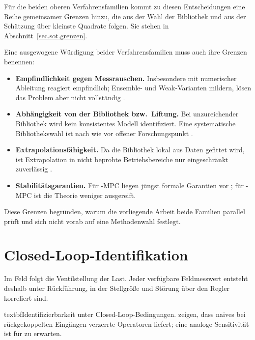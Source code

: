 Für die beiden oberen Verfahrensfamilien kommt zu diesen Entscheidungen
eine Reihe gemeinsamer Grenzen hinzu, die aus der Wahl der Bibliothek und
aus der Schätzung über kleinste Quadrate folgen. Sie stehen in
Abschnitt~\ref{sec.sot.grenzen}.

\label{sec.sot.grenzen}

Eine ausgewogene Würdigung beider Verfahrensfamilien muss auch ihre
Grenzen benennen:

\begin{itemize}
  \item \textbf{Empfindlichkeit gegen Messrauschen.} Insbesondere
    \sindy{} mit numerischer Ableitung reagiert empfindlich; Ensemble-
    und Weak-Varianten mildern, lösen das Problem aber nicht vollständig
    \cite{faselEnsembleSINDyRobustSparse2022, messengerWeakSINDyPartial2021}.
  \item \textbf{Abhängigkeit von der Bibliothek bzw.\ Liftung.} Bei
    unzureichender Bibliothek wird kein konsistentes Modell
    identifiziert. Eine systematische Bibliothekswahl ist nach wie vor
    offener Forschungspunkt \cite{kaiserSparseIdentificationNonlinear2018}.
  \item \textbf{Extrapolationsfähigkeit.} Da die Bibliothek lokal aus
    Daten gefittet wird, ist Extrapolation in nicht beprobte
    Betriebsbereiche nur eingeschränkt zuverlässig
    \cite{atamAdvancedAirPath2018}.
  \item \textbf{Stabilitätsgarantien.} Für \edmd-MPC liegen jüngst
    formale Garantien vor \cite{boldDataDrivenMPCStability2025}; für
    \sindy-MPC ist die Theorie weniger ausgereift.
\end{itemize}

Diese Grenzen begründen, warum die vorliegende Arbeit beide Familien
parallel prüft und sich nicht vorab auf eine Methodenwahl festlegt.


\section{Closed-Loop-Identifikation}
\label{closed_loop_identifkation}

Im Feld folgt die Ventilstellung der Last. Jeder verfügbare Feldmesswert
entsteht deshalb unter Rückführung, in der Stellgröße und Störung über
den Regler korreliert sind.


textbf{Identifizierbarkeit unter Closed-Loop-Bedingungen.}
    \cite{dahdahClosedloopKoopmanOperator2024} zeigen, dass naives
    \edmd{} bei rückgekoppelten Eingängen verzerrte Operatoren liefert;
    eine analoge Sensitivität ist für \sindy{} zu erwarten.


